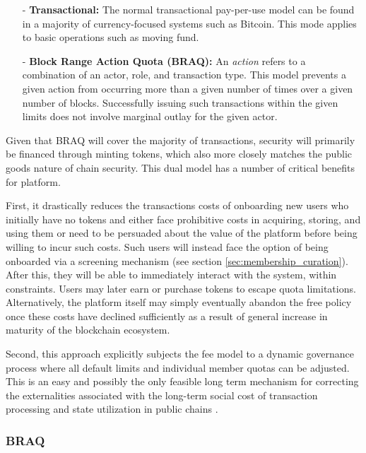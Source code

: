 \documentclass{article}
\begin{document}
\begin{itemize}

    \item[-] \textbf{Transactional:}  The normal transactional pay-per-use model can be found in a majority of currency-focused systems such as Bitcoin. This mode applies to basic operations such as moving fund.

    \item[-] \textbf{Block Range Action Quota (BRAQ):} An \textit{action} refers to a combination of an actor, role, and transaction type. This model prevents a given action from occurring more than a given number of times over a given number of blocks. Successfully issuing such transactions within the given limits does not involve marginal outlay for the given actor.

\end{itemize}

Given that BRAQ will cover the majority of transactions, security will primarily be financed through minting tokens, which also more closely matches the public goods nature of chain security. This dual model has a number of critical benefits for platform.

First, it drastically reduces the transactions costs of onboarding new users who initially have no tokens and either face prohibitive costs in acquiring, storing, and using them or need to be persuaded about the value of the platform before being willing to incur such costs. Such users will instead face the option of being onboarded via a screening mechanism (see section \ref{sec:membership_curation}). After this, they will be able to immediately interact with the system, within constraints. Users may later earn or purchase tokens to escape quota limitations. Alternatively, the platform itself may simply eventually abandon the free policy once these costs have declined sufficiently as a result of general increase in maturity of the blockchain ecosystem.

Second, this approach explicitly subjects the fee model to a dynamic governance process where all default limits and individual member quotas can be adjusted. This is an easy and possibly the only feasible long term mechanism for correcting the externalities associated with the long-term social cost of transaction processing and state utilization in public chains \cite{blockchain_resource_pricing}.

\subsubsection{BRAQ} \label{sec:BRAQ}
\end{document}
